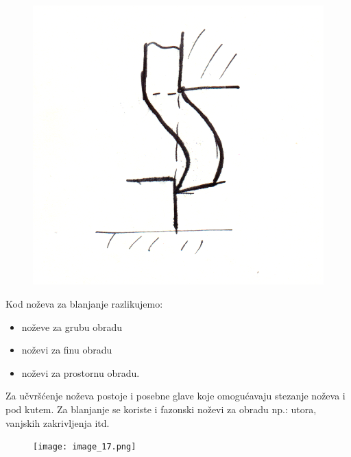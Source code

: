 \documentclass[a4paper,12pt]{article}
\numberwithin{figure}{section}
\begin{document}
\begin{figure}[!h]
\centering
\includegraphics[scale=0.15]{image_16-3.png}
\end{figure}
\FloatBarrier
Kod noževa za blanjanje razlikujemo:
\begin{itemize}
\item noževe za grubu obradu
\item noževi za finu obradu
\item noževi za prostornu obradu.
\end{itemize}
Za učvršćenje noževa postoje i posebne glave koje omogućavaju stezanje noževa i pod kutem. Za blanjanje se koriste i fazonski noževi za obradu np.: utora, vanjskih zakrivljenja itd.
\begin{figure}[!h]
\centering
\texttt{[image: image\_17.png]}
\end{figure}
\FloatBarrier
\end{document}
